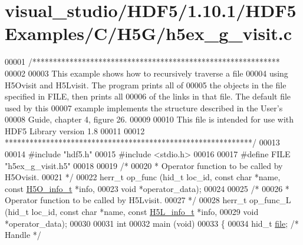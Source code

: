 \hypertarget{visual__studio_2_h_d_f5_21_810_81_2_h_d_f5_examples_2_c_2_h5_g_2h5ex__g__visit_8c_source}{}\section{visual\+\_\+studio/\+H\+D\+F5/1.10.1/\+H\+D\+F5\+Examples/\+C/\+H5\+G/h5ex\+\_\+g\+\_\+visit.c}
\label{visual__studio_2_h_d_f5_21_810_81_2_h_d_f5_examples_2_c_2_h5_g_2h5ex__g__visit_8c_source}

\begin{DoxyCode}
00001 \textcolor{comment}{/************************************************************}
00002 \textcolor{comment}{}
00003 \textcolor{comment}{  This example shows how to recursively traverse a file}
00004 \textcolor{comment}{  using H5Ovisit and H5Lvisit.  The program prints all of}
00005 \textcolor{comment}{  the objects in the file specified in FILE, then prints all}
00006 \textcolor{comment}{  of the links in that file.  The default file used by this}
00007 \textcolor{comment}{  example implements the structure described in the User's}
00008 \textcolor{comment}{  Guide, chapter 4, figure 26.}
00009 \textcolor{comment}{}
00010 \textcolor{comment}{  This file is intended for use with HDF5 Library version 1.8}
00011 \textcolor{comment}{}
00012 \textcolor{comment}{ ************************************************************/}
00013 
00014 \textcolor{preprocessor}{#include "hdf5.h"}
00015 \textcolor{preprocessor}{#include <stdio.h>}
00016 
00017 \textcolor{preprocessor}{#define FILE       "h5ex\_g\_visit.h5"}
00018 
00019 \textcolor{comment}{/*}
00020 \textcolor{comment}{ * Operator function to be called by H5Ovisit.}
00021 \textcolor{comment}{ */}
00022 herr\_t op\_func (hid\_t loc\_id, \textcolor{keyword}{const} \textcolor{keywordtype}{char} *name, \textcolor{keyword}{const} \hyperlink{struct_h5_o__info__t}{H5O\_info\_t} *info,
00023             \textcolor{keywordtype}{void} *operator\_data);
00024 
00025 \textcolor{comment}{/*}
00026 \textcolor{comment}{ * Operator function to be called by H5Lvisit.}
00027 \textcolor{comment}{ */}
00028 herr\_t op\_func\_L (hid\_t loc\_id, \textcolor{keyword}{const} \textcolor{keywordtype}{char} *name, \textcolor{keyword}{const} \hyperlink{struct_h5_l__info__t}{H5L\_info\_t} *info,
00029             \textcolor{keywordtype}{void} *operator\_data);
00030 
00031 \textcolor{keywordtype}{int}
00032 main (\textcolor{keywordtype}{void})
00033 \{
00034     hid\_t           \hyperlink{structfile}{file};           \textcolor{comment}{/* Handle */}

\end{DoxyCode}
